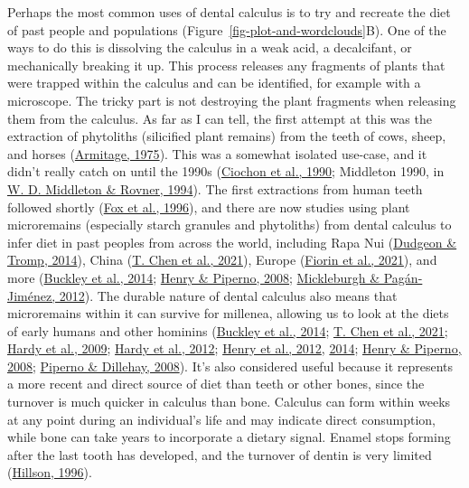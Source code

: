 \documentclass[
  letterpaper,
]{book}
\begin{document}
Perhaps the most common uses of dental calculus is to try and recreate
the diet of past people and populations
(Figure~\ref{fig-plot-and-wordclouds}B). One of the ways to do this is
dissolving the calculus in a weak acid, a decalcifant, or mechanically
breaking it up. This process releases any fragments of plants that were
trapped within the calculus and can be identified, for example with a
microscope. The tricky part is not destroying the plant fragments when
releasing them from the calculus. As far as I can tell, the first
attempt at this was the extraction of phytoliths (silicified plant
remains) from the teeth of cows, sheep, and horses
(\protect\hyperlink{ref-armitageExtractionIdentification1975}{Armitage,
1975}). This was a somewhat isolated use-case, and it didn't really
catch on until the 1990s
(\protect\hyperlink{ref-ciochonOpalPhytoliths1990}{Ciochon et al.,
1990}; Middleton 1990, in
\protect\hyperlink{ref-middletonOpalPhytoliths1994}{W. D. Middleton \&
Rovner, 1994}). The first extractions from human teeth followed shortly
(\protect\hyperlink{ref-foxPhytolithCalculus1996}{Fox et al., 1996}),
and there are now studies using plant microremains (especially starch
granules and phytoliths) from dental calculus to infer diet in past
peoples from across the world, including Rapa Nui
(\protect\hyperlink{ref-dudgeonDietGeography2014}{Dudgeon \& Tromp,
2014}), China (\protect\hyperlink{ref-chenStarchGrains2021}{T. Chen et
al., 2021}), Europe
(\protect\hyperlink{ref-fiorinCombiningDental2021}{Fiorin et al.,
2021}), and more
(\protect\hyperlink{ref-buckleyDentalCalculus2014}{Buckley et al.,
2014}; \protect\hyperlink{ref-henryCalculusSyria2008}{Henry \& Piperno,
2008}; \protect\hyperlink{ref-mickleburghNewInsights2012}{Mickleburgh \&
Pagán-Jiménez, 2012}). The durable nature of dental calculus also means
that microremains within it can survive for millenea, allowing us to
look at the diets of early humans and other hominins
(\protect\hyperlink{ref-buckleyDentalCalculus2014}{Buckley et al.,
2014}; \protect\hyperlink{ref-chenStarchGrains2021}{T. Chen et al.,
2021}; \protect\hyperlink{ref-hardyStarchGranules2009}{Hardy et al.,
2009}; \protect\hyperlink{ref-hardyNeanderthalMedics2012}{Hardy et al.,
2012}; \protect\hyperlink{ref-henryDietAustralopithecus2012}{Henry et
al., 2012}, \protect\hyperlink{ref-henryNeanderthalCalculus2014}{2014};
\protect\hyperlink{ref-henryCalculusSyria2008}{Henry \& Piperno, 2008};
\protect\hyperlink{ref-pipernoStarchGrains2008}{Piperno \& Dillehay,
2008}). It's also considered useful because it represents a more recent
and direct source of diet than teeth or other bones, since the turnover
is much quicker in calculus than bone. Calculus can form within weeks at
any point during an individual's life and may indicate direct
consumption, while bone can take years to incorporate a dietary signal.
Enamel stops forming after the last tooth has developed, and the
turnover of dentin is very limited
(\protect\hyperlink{ref-hillsonDentalAnthropology1996}{Hillson, 1996}).
\end{document}
